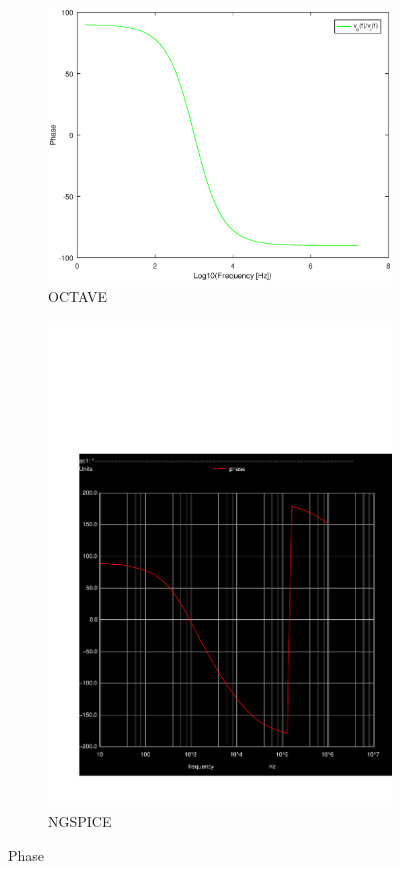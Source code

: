 
\begin{figure}[H] 
\centering
\begin{subfigure}{0.3\textwidth}
\includegraphics[width=\textwidth]{phase.eps}
\caption{OCTAVE}
\label{Octave_phase}
\end{subfigure}
\begin{subfigure}{0.3\textwidth}
\includegraphics[width=\textwidth]{phase.pdf}
\caption{NGSPICE}
\label{Ngspice_phase}
\end{subfigure}
\caption{Phase}
\end{figure}


